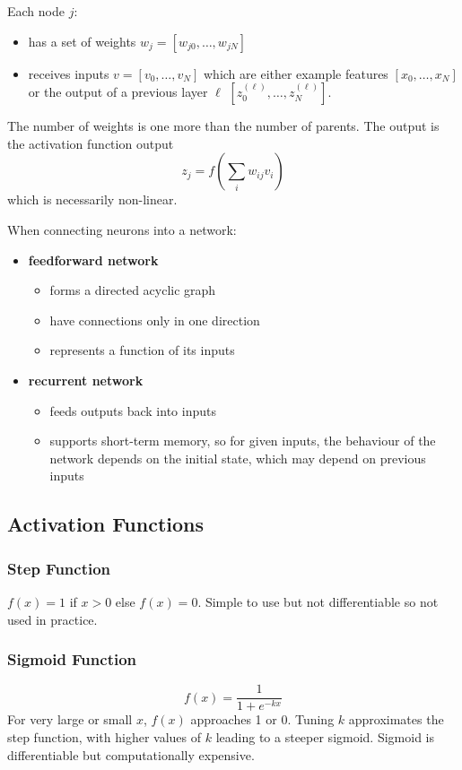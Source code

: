 \documentclass[11pt]{article}
\begin{document}
Each node \(j\):
\begin{itemize}
\item has a set of weights \(w_{j} = [w_{j0}, \dots, w_{jN}]\)
\item receives inputs \(v = [v_{0}, \dots, v_{N}]\) which are either example features
\([x_{0}, \dots, x_{N}]\) or the output of a previous layer \(\ell\)
\([z^{(\ell)}_{0}, \dots, z^{(\ell)}_{N}]\).
\end{itemize}

The number of weights is one more than the number of parents.
The output is the activation function output
$$ z_{j} = f \left( \sum_{i} w_{ij} v_{i} \right) $$
which is necessarily non-linear.

When connecting neurons into a network:
\begin{itemize}
\item \textbf{feedforward network}
\begin{itemize}
\item forms a directed acyclic graph
\item have connections only in one direction
\item represents a function of its inputs
\end{itemize}
\item \textbf{recurrent network}
\begin{itemize}
\item feeds outputs back into inputs
\item supports short-term memory, so for given inputs, the behaviour of the network
depends on the initial state, which may depend on previous inputs
\end{itemize}
\end{itemize}
\subsection{Activation Functions}
\label{sec:orge6ddaa5}
\subsubsection{Step Function}
\label{sec:org270878e}
\(f(x) = 1\) if \(x > 0\) else \(f(x) = 0\).
Simple to use but not differentiable so not used in practice.
\subsubsection{Sigmoid Function}
\label{sec:org5362f8e}
$$ f(x) = \frac{1}{1 + e^{-kx}} $$
For very large or small \(x\), \(f(x)\) approaches 1 or 0.
Tuning \(k\) approximates the step function, with higher values of \(k\)
leading to a steeper sigmoid.
Sigmoid is differentiable but computationally expensive.
\end{document}
